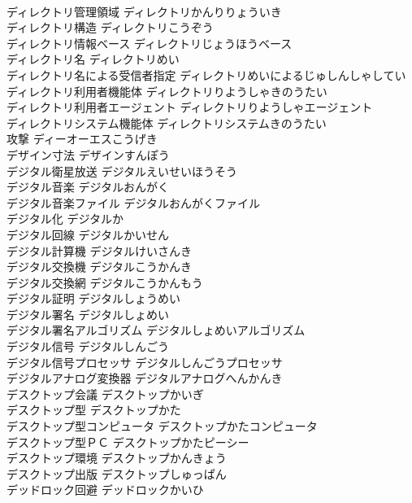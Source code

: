 \documentclass[8pt]{extreport}
\begin{document}
\begin{CJK}{UTF8}{min}
\\	ディレクトリ管理領域	ディレクトリかんりりょういき	
\\	ディレクトリ構造	ディレクトリこうぞう	
\\	ディレクトリ情報ベース	ディレクトリじょうほうベース	
\\	ディレクトリ名	ディレクトリめい	
\\	ディレクトリ名による受信者指定	ディレクトリめいによるじゅしんしゃしてい	
\\	ディレクトリ利用者機能体	ディレクトリりようしゃきのうたい	
\\	ディレクトリ利用者エージェント	ディレクトリりようしゃエージェント	
\\	ディレクトリシステム機能体	ディレクトリシステムきのうたい	
\\	攻撃	ディーオーエスこうげき	
\\	デザイン寸法	デザインすんぽう	
\\	デジタル衛星放送	デジタルえいせいほうそう	
\\	デジタル音楽	デジタルおんがく	
\\	デジタル音楽ファイル	デジタルおんがくファイル	
\\	デジタル化	デジタルか	
\\	デジタル回線	デジタルかいせん	
\\	デジタル計算機	デジタルけいさんき	
\\	デジタル交換機	デジタルこうかんき	
\\	デジタル交換網	デジタルこうかんもう	
\\	デジタル証明	デジタルしょうめい	
\\	デジタル署名	デジタルしょめい	
\\	デジタル署名アルゴリズム	デジタルしょめいアルゴリズム	
\\	デジタル信号	デジタルしんごう	
\\	デジタル信号プロセッサ	デジタルしんごうプロセッサ	
\\	デジタルアナログ変換器	デジタルアナログへんかんき	
\\	デスクトップ会議	デスクトップかいぎ	
\\	デスクトップ型	デスクトップかた	
\\	デスクトップ型コンピュータ	デスクトップかたコンピュータ	
\\	デスクトップ型ＰＣ	デスクトップかたピーシー	
\\	デスクトップ環境	デスクトップかんきょう	
\\	デスクトップ出版	デスクトップしゅっぱん	
\\	デッドロック回避	デッドロックかいひ	

\end{CJK}
\end{document}
